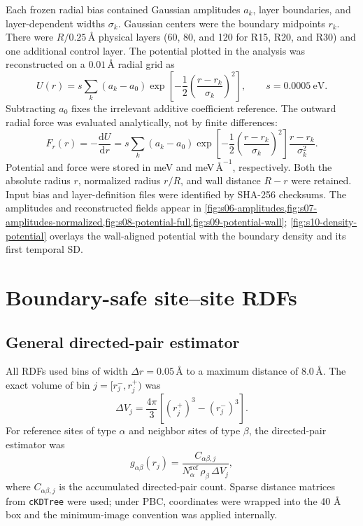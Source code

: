 \documentclass[11pt]{article}
\newcommand{\angstrom}{\text{\AA}}
\newcommand{\dd}{\mathrm{d}}
\begin{document}
Each frozen radial bias contained Gaussian amplitudes \(a_k\), layer
boundaries, and layer-dependent widths \(\sigma_k\).  Gaussian centers were
the boundary midpoints \(r_k\).  There were \(R/0.25\,\angstrom\) physical
layers (60, 80, and 120 for R15, R20, and R30) and one additional control
layer.  The potential plotted in the analysis was reconstructed on a
\(0.01\,\angstrom\) radial grid as
\begin{equation}
 U(r)=s\sum_k(a_k-a_0)
 \exp\left[-\frac12\left(\frac{r-r_k}{\sigma_k}\right)^2\right],
 \qquad s=0.0005\ \mathrm{eV}.
 \label{eq:potential}
\end{equation}
Subtracting \(a_0\) fixes the irrelevant additive coefficient reference.  The
outward radial force was evaluated analytically, not by finite differences:
\begin{equation}
 F_r(r)=-\frac{\dd U}{\dd r}
 =s\sum_k(a_k-a_0)
 \exp\left[-\frac12\left(\frac{r-r_k}{\sigma_k}\right)^2\right]
 \frac{r-r_k}{\sigma_k^2}.
 \label{eq:force}
\end{equation}
Potential and force were stored in meV and meV\(\,\angstrom^{-1}\),
respectively.  Both the absolute radius \(r\), normalized radius \(r/R\), and
wall distance \(R-r\) were retained.  Input bias and layer-definition files
were identified by SHA-256 checksums.
The amplitudes and reconstructed fields appear in
\cref{fig:s06-amplitudes,fig:s07-amplitudes-normalized,fig:s08-potential-full,fig:s09-potential-wall};
\cref{fig:s10-density-potential} overlays the wall-aligned potential with the
boundary density and its first temporal SD.

\section{Boundary-safe site--site RDFs}

\subsection{General directed-pair estimator}

All RDFs used bins of width \(\Delta r=0.05\,\angstrom\) to a maximum distance
of \(8.0\,\angstrom\).  The exact volume of bin \(j=[r_j^-,r_j^+)\) was
\begin{equation}
 \Delta V_j=\frac{4\pi}{3}\left[(r_j^+)^3-(r_j^-)^3\right].
 \label{eq:rdf-shell}
\end{equation}
For reference sites of type \(\alpha\) and neighbor sites of type \(\beta\),
the directed-pair estimator was
\begin{equation}
 g_{\alpha\beta}(r_j)=
 \frac{C_{\alpha\beta,j}}
 {N_{\alpha}^{\mathrm{ref}}\,\rho_\beta\,\Delta V_j},
 \label{eq:rdf-basic}
\end{equation}
where \(C_{\alpha\beta,j}\) is the accumulated directed-pair count.  Sparse
distance matrices from \texttt{cKDTree} were used; under PBC, coordinates were
wrapped into the 40 \(\angstrom\) box and the minimum-image convention was
applied internally.
\end{document}
